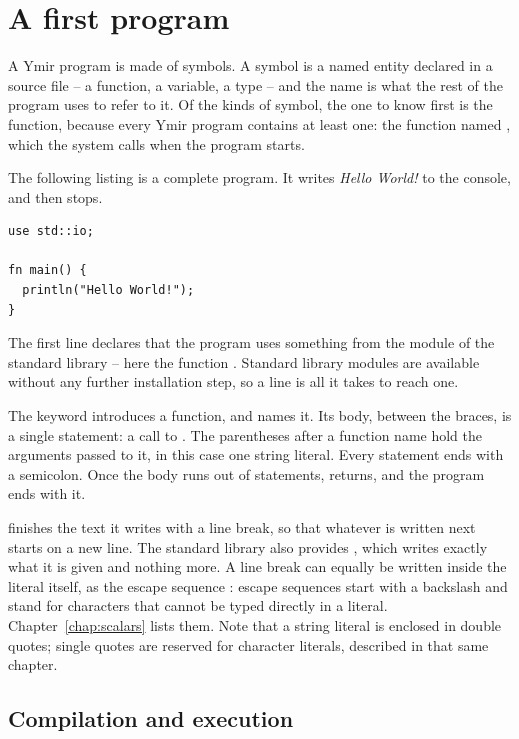 \section{A first program}
\label{sec:basics:first_program}

A Ymir program is made of symbols. A symbol is a named entity declared in a
source file -- a function, a variable, a type -- and the name is what the rest of
the program uses to refer to it. Of the kinds of symbol, the one to know first is
the function, because every Ymir program contains at least one: the function
named , which the system calls when the program starts.

The following listing is a complete program. It writes \textit{Hello World!} to
the console, and then stops.

\begin{lstlisting}[style=coloredverbatim, caption=Source file \textit{hello.yr}, label=lst:basics:hello_world]
use std::io;

fn main() {
  println("Hello World!");
}
\end{lstlisting}

The first line declares that the program uses something from the 
module of the standard library -- here the function . Standard
library modules are available without any further installation step, so a
 line is all it takes to reach one.

The keyword  introduces a function, and  names it. Its
body, between the braces, is a single statement: a call to . The
parentheses after a function name hold the arguments passed to it, in this case
one string literal. Every statement ends with a semicolon. Once the body runs out
of statements,  returns, and the program ends with it.

 finishes the text it writes with a line break, so that whatever
is written next starts on a new line. The standard library also provides
, which writes exactly what it is given and nothing more. A line
break can equally be written inside the literal itself, as the escape sequence
: escape sequences start with a backslash and stand
for characters that cannot be typed directly in a literal.
Chapter~\ref{chap:scalars} lists them. Note that a string literal is enclosed in
double quotes; single quotes are reserved for character literals, described in
that same chapter.

\subsection{Compilation and execution}
\label{sec:basics:compilation_execution}

